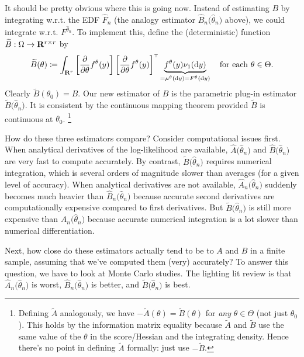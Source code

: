 \documentclass[11pt,letterpaper,reqno,oneside]{article}
\begin{document}
It should be pretty obvious where this is going now. Instead of estimating $B$ by integrating w.r.t. the EDF $\widehat{F}_n$ (the analogy estimator $\widehat{B}_n\bigl(\widehat{\theta}_n\bigr)$ above), we could integrate w.r.t. $F^{\widehat{\theta}_n}$. To implement this, define the (deterministic) function $\widetilde{B} : \Omega \to \mathbf{R}^{r \times r}$ by
%
\begin{equation*}
	\widetilde{B}(\theta)
	\coloneqq \int_{\mathbf{R}^r} 
	\left[ \frac{\partial}{\partial\theta} f^{\theta}(y) \right]
	\left[ \frac{\partial}{\partial\theta} f^{\theta}(y) \right]^{\scriptscriptstyle \top}
	\underbrace{ f^{\theta}(y) \nu_1(\mathrm{d} y) }_{=\mu^\theta( \mathrm{d} y )=F^\theta( \mathrm{d} y )}
	\quad\text{for each $\theta \in \Theta$} .
\end{equation*}
%
Clearly $\widetilde{B}(\theta_0)=B$. Our new estimator of $B$ is the parametric plug-in estimator $\widetilde{B}\bigl( \widehat{\theta}_n \bigr)$. It is consistent by the continuous mapping theorem provided $\widetilde{B}$ is continuous at $\theta_0$.%
	\footnote{Defining $\widetilde{A}$ analogously, we have $-\widetilde{A}(\theta) = \widetilde{B}(\theta)$ for \emph{any} $\theta \in \Theta$ (not just $\theta_0$). This holds by the information matrix equality because $\widetilde{A}$ and $\widetilde{B}$ use the same value of the $\theta$ in the score/Hessian and the integrating density. Hence there's no point in defining $\widetilde{A}$ formally: just use $-\widetilde{B}$.}


How do these three estimators compare? Consider computational issues first. When analytical derivatives of the log-likelihood are available, $\widehat{A}\bigl( \widehat{\theta}_n \bigr)$ and $\widehat{B}\bigl( \widehat{\theta}_n \bigr)$ are very fast to compute accurately. By contrast, $\widetilde{B}\bigl( \widehat{\theta}_n \bigr)$ requires numerical integration, which is several orders of magnitude slower than averages (for a given level of accuracy). When analytical derivatives are not available, $\widehat{A}_n\bigl( \widehat{\theta}_n \bigr)$ suddenly becomes much heavier than $\widehat{B}_n\bigl( \widehat{\theta}_n \bigr)$ because accurate second derivatives are computationally expensive compared to first derivatives. But $\widetilde{B}\bigl( \widehat{\theta}_n \bigr)$ is still more expensive than $\widehat{A}_n\bigl( \widehat{\theta}_n \bigr)$ because accurate numerical integration is a lot slower than numerical differentiation.

Next, how close do these estimators actually tend to be to $A$ and $B$ in a finite sample, assuming that we've computed them (very) accurately? To answer this question, we have to look at Monte Carlo studies. The lighting lit review is that $\widehat{A}_n\bigl( \widehat{\theta}_n \bigr)$ is worst, $\widehat{B}_n\bigl( \widehat{\theta}_n \bigr)$ is better, and $\widetilde{B}\bigl( \widehat{\theta}_n \bigr)$ is best.
\end{document}
